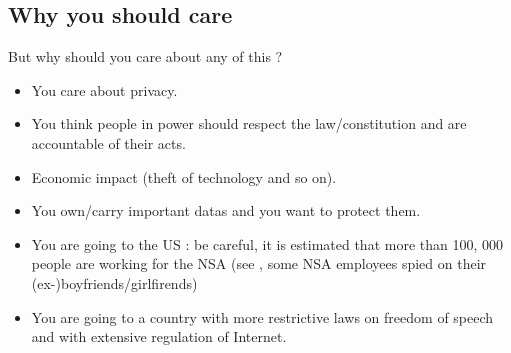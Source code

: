 \documentclass[compress]{beamer}
\theoremstyle{definition}
\theoremstyle{definition}
\theoremstyle{definition}
\theoremstyle{remark}
\theoremstyle{remark}
\theoremstyle{definition}
\theoremstyle{definition}
\theoremstyle{definition}
\theoremstyle{definition}
\theoremstyle{definition}
\theoremstyle{remark}
\theoremstyle{remark}
\theoremstyle{remark}
\theoremstyle{remark}
\begin{document}
			\subsection{Why you should care}
			\begin{frame}
				\begin{block}{But why should you care about any of this ?}
				\begin{itemize}[<+-| structure@+>]
					\item You care about privacy. %
					\vspace*{3mm}
					\item You think people in power should respect the law/constitution and are accountable of their acts. %
					\vspace*{3mm}
					\item Economic impact (theft of technology and so on).
					\vspace*{3mm}
					\item You own/carry important datas and you want to protect them.
					\vspace*{3mm}
					\item You are going to the US : be careful, it is estimated that more than 100, 000 people are working for the NSA (see \cite{womenspied}, some NSA employees spied on their (ex-)boyfriends/girlfirends)
					\vspace*{3mm}
					\item You are going to a country with more restrictive laws on freedom of speech and with extensive regulation of Internet.
				\end{itemize}
				\end{block}%
			\end{frame}
%				
%
%
\end{document}
